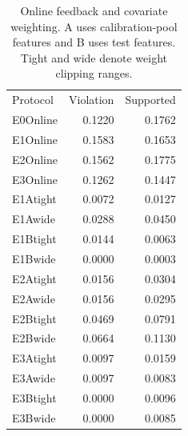 \begin{table}[!ht]
\centering\small
\caption{Online feedback and covariate weighting. A uses calibration-pool features and B uses test features. Tight and wide denote weight clipping ranges.}
\begin{tabular}{lrr}
\hline
Protocol & Violation & Supported \\
E0Online & 0.1220 & 0.1762 \\
E1Online & 0.1583 & 0.1653 \\
E2Online & 0.1562 & 0.1775 \\
E3Online & 0.1262 & 0.1447 \\
E1Atight & 0.0072 & 0.0127 \\
E1Awide & 0.0288 & 0.0450 \\
E1Btight & 0.0144 & 0.0063 \\
E1Bwide & 0.0000 & 0.0003 \\
E2Atight & 0.0156 & 0.0304 \\
E2Awide & 0.0156 & 0.0295 \\
E2Btight & 0.0469 & 0.0791 \\
E2Bwide & 0.0664 & 0.1130 \\
E3Atight & 0.0097 & 0.0159 \\
E3Awide & 0.0097 & 0.0083 \\
E3Btight & 0.0000 & 0.0096 \\
E3Bwide & 0.0000 & 0.0085 \\
\hline
\end{tabular}
\end{table}
